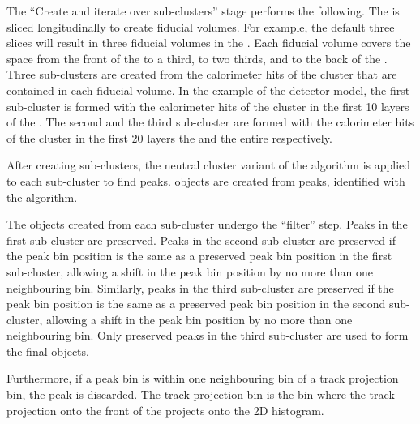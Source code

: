 The ``Create and iterate over sub-clusters'' stage performs the following. The \ECAL is sliced longitudinally to create fiducial volumes. For example, the default three slices will result in three  fiducial volumes in the \ECAL. Each fiducial volume covers the  space from the front of the \ECAL to a third, to two thirds, and to the back of the \ECAL. Three sub-clusters are created from the calorimeter hits of the cluster that are contained in each fiducial volume. In the example of the \ILD detector model, the first sub-cluster is formed with the  calorimeter hits of the cluster in the first 10 layers of the \ECAL. The second and the third sub-cluster are formed with the  calorimeter hits of the cluster in the first 20 layers  the \ECAL and the entire \ECAL respectively.

After creating sub-clusters, the neutral cluster variant of the  \peakFinding algorithm is applied to each sub-cluster to find peaks. \ShowerPeak objects are created from peaks, identified with the  \peakFinding algorithm.


The \ShowerPeak objects created from each sub-cluster undergo the ``\ShowerPeak filter'' step. Peaks in the first sub-cluster are preserved. Peaks in the second sub-cluster are preserved if the peak bin position is the same as a preserved peak bin position in the first sub-cluster, allowing a shift in the peak bin position by no more than one neighbouring bin. Similarly, peaks in the third sub-cluster are preserved if the peak bin position is the same as a preserved peak bin position in the second sub-cluster, allowing a shift in the peak bin position by no more than one neighbouring bin. Only preserved peaks in the third sub-cluster are used to form the final \ShowerPeak objects.

Furthermore, if a peak bin is within one neighbouring bin of a track projection bin, the peak is discarded. The track projection bin  is the bin where the track projection onto the front of the \ECAL projects onto the 2D histogram.




